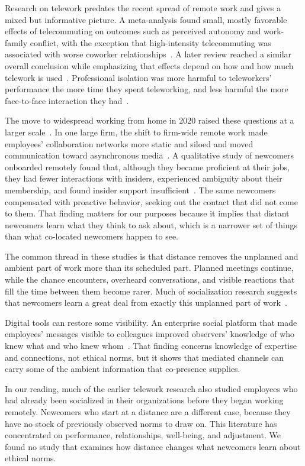 Research on telework predates the recent spread of remote work and gives a mixed but informative picture. A meta-analysis found small, mostly favorable effects of telecommuting on outcomes such as perceived autonomy and work-family conflict, with the exception that high-intensity telecommuting was associated with worse coworker relationships~\citep{gajendran2007good}. A later review reached a similar overall conclusion while emphasizing that effects depend on how and how much telework is used~\citep{allen2015how}. Professional isolation was more harmful to teleworkers' performance the more time they spent teleworking, and less harmful the more face-to-face interaction they had~\citep{golden2008impact}.

The move to widespread working from home in 2020 raised these questions at a larger scale~\citep{kniffin2021covid}. In one large firm, the shift to firm-wide remote work made employees' collaboration networks more static and siloed and moved communication toward asynchronous media~\citep{yang2022effects}. A qualitative study of newcomers onboarded remotely found that, although they became proficient at their jobs, they had fewer interactions with insiders, experienced ambiguity about their membership, and found insider support insufficient~\citep{paik2026membership}. The same newcomers compensated with proactive behavior, seeking out the contact that did not come to them. That finding matters for our purposes because it implies that distant newcomers learn what they think to ask about, which is a narrower set of things than what co-located newcomers happen to see.

The common thread in these studies is that distance removes the unplanned and ambient part of work more than its scheduled part. Planned meetings continue, while the chance encounters, overheard conversations, and visible reactions that fill the time between them become rarer. Much of socialization research suggests that newcomers learn a great deal from exactly this unplanned part of work~\citep{reichers1987interactionist}.

Digital tools can restore some visibility. An enterprise social platform that made employees' messages visible to colleagues improved observers' knowledge of who knew what and who knew whom~\citep{leonardi2015ambient}. That finding concerns knowledge of expertise and connections, not ethical norms, but it shows that mediated channels can carry some of the ambient information that co-presence supplies.

In our reading, much of the earlier telework research also studied employees who had already been socialized in their organizations before they began working remotely. Newcomers who start at a distance are a different case, because they have no stock of previously observed norms to draw on. This literature has concentrated on performance, relationships, well-being, and adjustment. We found no study that examines how distance changes what newcomers learn about ethical norms.

